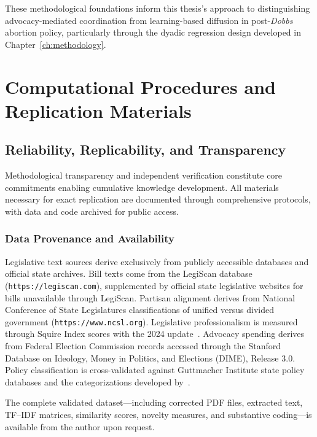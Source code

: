 \documentclass[12pt]{report}
\begin{document}
These methodological foundations inform this thesis's approach to distinguishing
advocacy-mediated coordination from learning-based diffusion in post-\emph{Dobbs}
abortion policy, particularly through the dyadic regression design developed in
Chapter~\ref{ch:methodology}.

\chapter{Computational Procedures and Replication Materials}
\label{app:B}

\section{Reliability, Replicability, and Transparency}
\label{app:B.1}
Methodological transparency and independent verification constitute core commitments
enabling cumulative knowledge development. All materials necessary for exact replication
are documented through comprehensive protocols, with data and code archived for public
access.

\subsection{Data Provenance and Availability}
Legislative text sources derive exclusively from publicly accessible databases and
official state archives. Bill texts come from the LegiScan database
(\texttt{https://legiscan.com}), supplemented by official state legislative websites
for bills unavailable through LegiScan. Partisan alignment derives from National
Conference of State Legislatures classifications of unified versus divided government
(\texttt{https://www.ncsl.org}). Legislative professionalism is measured through Squire
Index scores with the 2024 update~\parencite{squireSquireIndexUpdate2024}. Advocacy
spending derives from Federal Election Commission records accessed through the Stanford
Database on Ideology, Money in Politics, and Elections (DIME), Release 3.0. Policy
classification is cross-validated against Guttmacher Institute state policy databases
and the categorizations developed by~\textcite{nash13StatesHave2022}.

The complete validated dataset---including corrected PDF files, extracted text, TF--IDF matrices, similarity scores, novelty measures, and substantive coding---is available from the author upon request.
\end{document}
